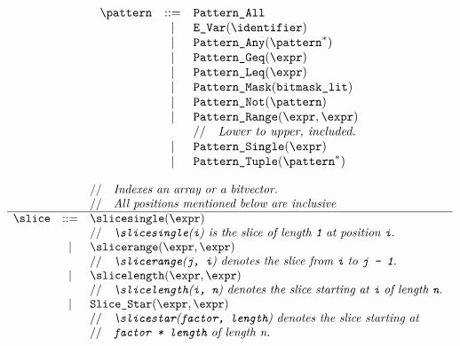 \documentclass{book}
\begin{document}
\[
\begin{array}{rcl}
\pattern &::=& \texttt{Pattern\_All} \\
	&|& \texttt{E\_Var}(\texttt{\identifier}) \\
  &|& \texttt{Pattern\_Any}(\pattern^{*}) \\
  &|& \texttt{Pattern\_Geq}(\expr) \\
  &|& \texttt{Pattern\_Leq}(\expr) \\
  &|& \texttt{Pattern\_Mask}(\texttt{bitmask\_lit}) \\
  &|& \texttt{Pattern\_Not}(\pattern) \\
  &|& \texttt{Pattern\_Range}(\expr, \expr)\\
  & & \ASTComment{Lower to upper, included.}\\
  &|& \texttt{Pattern\_Single}(\expr) \\
  &|& \texttt{Pattern\_Tuple}(\pattern^{*}) \\
\end{array}
\]

\[
\begin{array}{rcl}
&&\ASTComment{Indexes an array or a bitvector.}\\
&&\ASTComment{All positions mentioned below are inclusive}\\
\hline
\slice &::=& \slicesingle(\expr) \\
  & & \ASTComment{\slicesingle(\texttt{i}) is the slice of length \texttt{1} at position \texttt{i}.}\\
  &|& \slicerange(\expr, \expr) \\
  & & \ASTComment{\slicerange(\texttt{j, i}) denotes the slice from \texttt{i} to \texttt{j - 1}.}\\
  &|& \slicelength(\expr, \expr) \\
  & & \ASTComment{\slicelength(\texttt{i, n}) denotes the slice starting at \texttt{i} of length \texttt{n}.}\\
  &|& \texttt{Slice\_Star}(\expr, \expr) \\
  & & \ASTComment{\slicestar(\texttt{factor, length}) denotes the slice starting at }\\
  & & \ASTComment{\texttt{factor * length} of length n.}\\
\end{array}
\]
\end{document}
